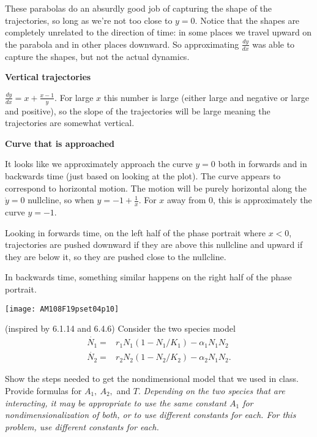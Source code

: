 \documentclass[12pt,letterpaper,answers]{exam}
\begin{document}
\begin{questions}
\begin{parts}
\begin{solution}
These parabolas do an absurdly good job of capturing the shape of the trajectories, so long as we're not too close to $y = 0$.  Notice that the shapes are completely unrelated to the direction of time: in some places we travel upward on the parabola and in other places downward.  So approximating $\frac{dy}{dx}$ was able to capture the shapes, but not the actual dynamics.


\textbf{Vertical trajectories}

$\frac{dy}{dx} = x + \frac{x-1}{y}$.  For large $x$ this number is large (either large and negative or large and positive), so the slope of the trajectories will be large meaning the trajectories are somewhat vertical.

\textbf{Curve that is approached}

It looks like we approximately approach the curve $y=0$ both in forwards and in backwards time (just based on looking at the plot).  The curve appears to correspond to horizontal motion.  The motion will be purely horizontal along the $\dot{y} = 0$ nullcline, so when $y = -1 + \frac{1}{x}$.  For $x$ away from $0$, this is approximately the curve $y = -1$.

Looking in forwards time, on the left half of the phase portrait where $ x < 0$, trajectories are pushed downward if they are above this nullcline and upward if they are below it, so they are pushed close to the nullcline.  

In backwards time, something similar happens on the right half of the phase portrait.


\texttt{[image: AM108F19pset04p10]} 
\end{solution}
\end{parts}

\question (inspired by 6.1.14 and 6.4.6) Consider the two species model \begin{align*}\dot{N_1} = & r_1 N_1 (1-N_1/K_1) - \alpha_1 N_1 N_2 \\ \dot{N_2} = & r_2 N_2(1-N_2/K_2) - \alpha_2N_1N_2.\end{align*}

\begin{parts}
\item Show the steps needed to get the nondimensional model that we used in class.  Provide formulas for $A_1, \ A_2,$ and $T$.  \emph{Depending on the two species that are interacting, it may be appropriate to use the same constant $A_1$ for nondimensionalization of both, or to use different constants for each.  For this problem, use different constants for each.}


\end{parts}
\end{questions}
\end{document}
